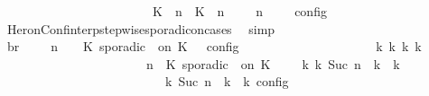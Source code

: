 \begin{isabellebody}
\ \ \ \ \ \ \ \ \ \ \ \ \ \ \ \ \ \ \ \ \ \ {\isasymunion}\ {\isasymlbrakk}\ {\isacharparenleft}{\isacharparenleft}K\ {\isasymUp}\ n{\isacharparenright}\ {\isacharhash}\ {\isacharparenleft}K\ {\isasymDown}\ n\ {\isacharat}\ {\isasymtau}{\isacharparenright}\ {\isacharhash}\ {\isasymGamma}{\isacharparenright}{\isacharcomma}\ n\ {\isasymturnstile}\ {\isasymPsi}\ {\isasymtriangleright}\ {\isasymPhi}\ {\isasymrbrakk}\isactrlsub c\isactrlsub o\isactrlsub n\isactrlsub f\isactrlsub i\isactrlsub g{\isacartoucheclose}\isanewline
\ \ \ \ \ \ \ \ \ \ \isamarkupfalse%
\ HeronConf{\isacharunderscore}interp{\isacharunderscore}stepwise{\isacharunderscore}sporadicon{\isacharunderscore}cases\ \isamarkupfalse%
\ simp\isanewline
\ \ \ \ \ \ \ \ \isamarkupfalse%
\ br{}{\isacharcolon}\ {\isacartoucheopen}{\isasymrho}\ {\isasymin}\ {\isasymlbrakk}\ {\isasymGamma}{\isacharcomma}\ n\ {\isasymturnstile}\ {\isasymPsi}\ {\isasymtriangleright}\ {\isacharparenleft}{\isacharparenleft}K\ sporadic\ {\isasymtau}\ on\ K\ {\isacharhash}\ {\isasymPhi}{\isacharparenright}\ {\isasymrbrakk}\isactrlsub c\isactrlsub o\isactrlsub n\isactrlsub f\isactrlsub i\isactrlsub g\isanewline
\ \ \ \ \ \ \ \ \ \ \ \ \ \ \ \ \ \ \ \ {\isasymLongrightarrow}\ {\isasymexists}{\isasymGamma}\isactrlsub k\ {\isasymPsi}\isactrlsub k\ {\isasymPhi}\isactrlsub k\ k{\isachardot}\isanewline
\ \ \ \ \ \ \ \ \ \ \ \ \ \ \ \ \ \ \ \ \ \ {\isacharparenleft}{\isacharparenleft}{\isasymGamma}{\isacharcomma}\ n\ {\isasymturnstile}\ {\isacharparenleft}{\isacharparenleft}K\ sporadic\ {\isasymtau}\ on\ K\ {\isacharhash}\ {\isasymPsi}{\isacharparenright}\ {\isasymtriangleright}\ {\isasymPhi}{\isacharparenright}\ {\isasymhookrightarrow}\isactrlbsup k\isactrlesup \ {\isacharparenleft}{\isasymGamma}\isactrlsub k{\isacharcomma}\ Suc\ n\ {\isasymturnstile}\ {\isasymPsi}\isactrlsub k\ {\isasymtriangleright}\ {\isasymPhi}\isactrlsub k{\isacharparenright}{\isacharparenright}\isanewline
\ \ \ \ \ \ \ \ \ \ \ \ \ \ \ \ \ \ \ \ \ \ {\isasymand}\ {\isasymrho}\ {\isasymin}\ {\isasymlbrakk}\ {\isasymGamma}\isactrlsub k{\isacharcomma}\ Suc\ n\ {\isasymturnstile}\ {\isasymPsi}\isactrlsub k\ {\isasymtriangleright}\ {\isasymPhi}\isactrlsub k\ {\isasymrbrakk}\isactrlsub c\isactrlsub o\isactrlsub n\isactrlsub f\isactrlsub i\isactrlsub g{\isacartoucheclose}\isanewline
\ \ \ \ \ \ \ \ \isamarkupfalse%

\end{isabellebody}
